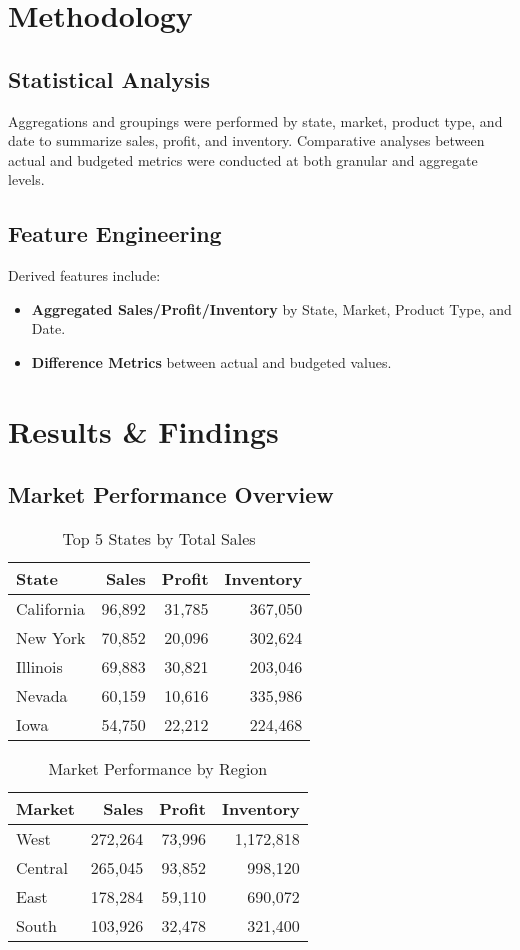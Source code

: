 \documentclass[11pt]{article}
\begin{document}
\section{Methodology}
\subsection{Statistical Analysis}
Aggregations and groupings were performed by state, market, product type, and date to summarize sales, profit, and inventory. Comparative analyses between actual and budgeted metrics were conducted at both granular and aggregate levels.

\subsection{Feature Engineering}
Derived features include:
\begin{itemize}
    \item \textbf{Aggregated Sales/Profit/Inventory} by State, Market, Product Type, and Date.
    \item \textbf{Difference Metrics} between actual and budgeted values.
\end{itemize}

\section{Results \& Findings}

\subsection{Market Performance Overview}
\begin{table}[H]
\centering
\caption{Top 5 States by Total Sales}
\begin{tabular}{lrrr}
\toprule
State & Sales & Profit & Inventory \\
\midrule
California & 96,892 & 31,785 & 367,050 \\
New York   & 70,852 & 20,096 & 302,624 \\
Illinois   & 69,883 & 30,821 & 203,046 \\
Nevada     & 60,159 & 10,616 & 335,986 \\
Iowa       & 54,750 & 22,212 & 224,468 \\
\bottomrule
\end{tabular}
\end{table}

\begin{table}[H]
\centering
\caption{Market Performance by Region}
\begin{tabular}{lrrr}
\toprule
Market & Sales & Profit & Inventory \\
\midrule
West    & 272,264 & 73,996 & 1,172,818 \\
Central & 265,045 & 93,852 & 998,120 \\
East    & 178,284 & 59,110 & 690,072 \\
South   & 103,926 & 32,478 & 321,400 \\
\bottomrule
\end{tabular}
\end{table}
\end{document}

